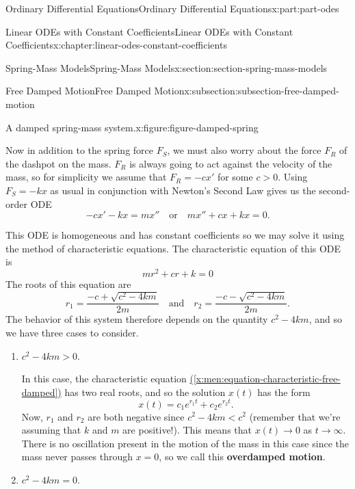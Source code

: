 \documentclass[twoside,10pt,]{book}
\newcommand{\xreffont}{\relax}
\newcommand{\terminology}[1]{\textbf{#1}}
\numberwithin{equation}{part}
\newcommand{\lt}{<}
\newcommand{\gt}{>}
\begin{document}
\begin{partptx}{Ordinary Differential Equations}{}{Ordinary Differential Equations}{}{}{x:part:part-odes}
\begin{chapterptx}{Linear ODEs with Constant Coefficients}{}{Linear ODEs with Constant Coefficients}{}{}{x:chapter:linear-odes-constant-coefficients}
\begin{sectionptx}{Spring-Mass Models}{}{Spring-Mass Models}{}{}{x:section:section-spring-mass-models}
\begin{subsectionptx}{Free Damped Motion}{}{Free Damped Motion}{}{}{x:subsection:subsection-free-damped-motion}
\begin{figureptx}{A damped spring-mass system.}{x:figure:figure-damped-spring}{}
\begin{image}{0}{1}{0}
{\begin{tikzpicture}
\end{tikzpicture}
}%
\end{image}%
\tcblower
\end{figureptx}%
Now in addition to the spring force \(F_{S}\), we must also worry about the force \(F_{R}\) of the dashpot on the mass. \(F_{R}\) is always going to act against the velocity of the mass, so for simplicity we assume that \(F_{R} = -cx'\) for some \(c > 0\). Using \(F_{S} = -kx\) as usual in conjunction with Newton's Second Law gives us the second-order ODE%
\begin{equation*}
-cx'-kx = mx''\quad\text{or}\quad mx'' + cx + kx = 0.
\end{equation*}
%
\par
This ODE is homogeneous and has constant coefficients so we may solve it using the method of characteristic equations. The characteristic equation of this ODE is%
\begin{equation}
mr^{2} + cr + k = 0\label{x:men:equation-characteristic-free-damped}
\end{equation}
The roots of this equation are%
\begin{equation}
r_{1} = \frac{-c + \sqrt{c^{2} - 4km}}{2m}\quad\text{and}\quad r_{2} = \frac{-c - \sqrt{c^{2} - 4km}}{2m}.\label{x:men:equation-characteristic-free-damped-roots}
\end{equation}
The behavior of this system therefore depends on the quantity \(c^{2} - 4km\), and so we have three cases to consider.%
%
\begin{enumerate}[label=\arabic*:]
\item{}\(c^{2} - 4km \gt 0\).%
\par
In this case, the characteristic equation \hyperref[x:men:equation-characteristic-free-damped]{({\xreffont\ref{x:men:equation-characteristic-free-damped}})} has two real roots, and so the solution \(x(t)\) has the form%
\begin{equation*}
x(t) = c_{1}e^{r_{1}t} + c_{2}e^{r_{2}t}.
\end{equation*}
Now, \(r_{1}\) and \(r_{2}\) are both negative since \(c^{2} - 4km \lt c^{2}\) (remember that we're assuming that \(k\) and \(m\) are positive!). This means that \(x(t)\to0\) as \(t\to\infty\). There is no oscillation present in the motion of the mass in this case since the mass never passes through \(x = 0\), so we call this \terminology{overdamped motion}.%
\item{}\(c^{2} - 4km = 0\).%
\par

\end{enumerate}
\end{subsectionptx}
\end{sectionptx}
\end{chapterptx}
\end{partptx}
\end{document}
